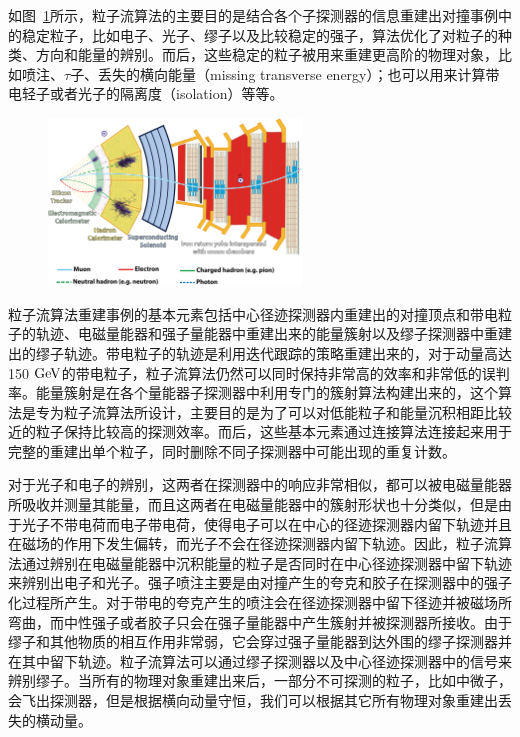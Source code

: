 如图~\ref{fig:c03f01}所示，粒子流算法的主要目的是结合各个子探测器的信息重建出对撞事例中的稳定粒子，比如电子、光子、缪子以及比较稳定的强子，算法优化了对粒子的种类、方向和能量的辨别。而后，这些稳定的粒子被用来重建更高阶的物理对象，比如喷注、$\tau$子、丢失的横向能量（missing transverse energy）；也可以用来计算带电轻子或者光子的隔离度（isolation）等等。

\begin{figure}[!htbp]
    \centering
    \includegraphics[width=0.6\textwidth]{figures/chapter03/CMSslice_whiteBackground.png}
    \label{fig:c03f01}
\end{figure}

粒子流算法重建事例的基本元素包括中心径迹探测器内重建出的对撞顶点和带电粒子的轨迹、电磁量能器和强子量能器中重建出来的能量簇射以及缪子探测器中重建出的缪子轨迹。带电粒子的轨迹是利用迭代跟踪的策略重建出来的，对于动量高达150$\GeV$的带电粒子，粒子流算法仍然可以同时保持非常高的效率和非常低的误判率。能量簇射是在各个量能器子探测器中利用专门的簇射算法构建出来的，这个算法是专为粒子流算法所设计，主要目的是为了可以对低能粒子和能量沉积相距比较近的粒子保持比较高的探测效率。而后，这些基本元素通过连接算法连接起来用于完整的重建出单个粒子，同时删除不同子探测器中可能出现的重复计数。

对于光子和电子的辨别，这两者在探测器中的响应非常相似，都可以被电磁量能器所吸收并测量其能量，而且这两者在电磁量能器中的簇射形状也十分类似，但是由于光子不带电荷而电子带电荷，使得电子可以在中心的径迹探测器内留下轨迹并且在磁场的作用下发生偏转，而光子不会在径迹探测器内留下轨迹。因此，粒子流算法通过辨别在电磁量能器中沉积能量的粒子是否同时在中心径迹探测器中留下轨迹来辨别出电子和光子。强子喷注主要是由对撞产生的夸克和胶子在探测器中的强子化过程所产生。对于带电的夸克产生的喷注会在径迹探测器中留下径迹并被磁场所弯曲，而中性强子或者胶子只会在强子量能器中产生簇射并被探测器所接收。由于缪子和其他物质的相互作用非常弱，它会穿过强子量能器到达外围的缪子探测器并在其中留下轨迹。粒子流算法可以通过缪子探测器以及中心径迹探测器中的信号来辨别缪子。当所有的物理对象重建出来后，一部分不可探测的粒子，比如中微子，会飞出探测器，但是根据横向动量守恒，我们可以根据其它所有物理对象重建出丢失的横动量。

